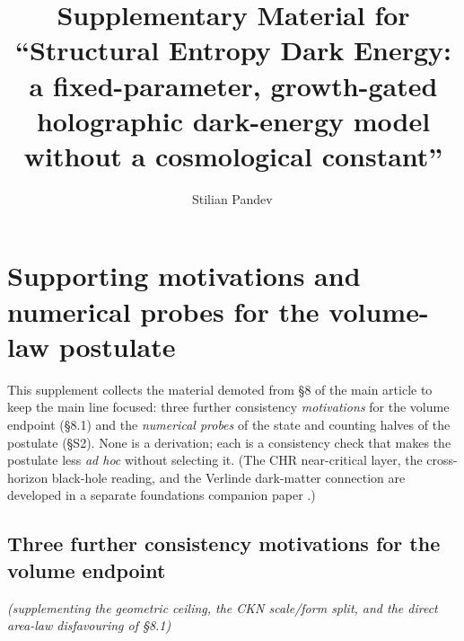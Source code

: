 \documentclass[11pt,a4paper]{article}
\title{Supplementary Material for ``Structural Entropy Dark Energy: a
fixed-parameter, growth-gated holographic dark-energy model without a
cosmological constant''}
\author{Stilian Pandev\,\orcidlink{0009-0005-8153-071X}}
\affiliation{Independent researcher}
\begin{document}
\maketitle
\section{Supporting motivations and numerical probes for the volume-law
postulate}\label{sec-1}

This supplement collects the material demoted from §8 of the main
article to keep the main line focused: three further consistency
\emph{motivations} for the volume endpoint (§8.1) and the
\emph{numerical probes} of the state and counting halves of the
postulate (§S2). None is a derivation; each is a consistency check that
makes the postulate less \emph{ad hoc} without selecting it. (The CHR
near-critical layer, the cross-horizon black-hole reading, and the
Verlinde dark-matter connection are developed in a separate foundations
companion paper \citep{Pandev:2026foundations}.)

\subsection{Three further consistency motivations for the volume
endpoint}\label{sec-1-1}

\emph{(supplementing the geometric ceiling, the CKN scale/form split,
and the direct area-law disfavouring of §8.1)}
\end{document}
